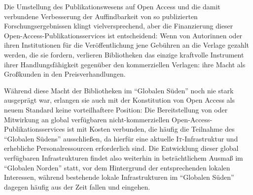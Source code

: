 \documentclass[a4paper,
fontsize=11pt,
oneside,
numbers=noperiodatend,
parskip=half-,
bibliography=totoc,
final
]{scrartcl}
\begin{document}
Die Umstellung des Publikationswesens auf Open Access und die damit
verbundene Verbesserung der Auffindbarkeit von so publizierten
Forschungsergebnissen klingt vielversprechend, aber die Finanzierung
dieser Open-Access-Publikationsservices ist entscheidend: Wenn von
Autorïnnen oder ihren Institutionen für die Veröffentlichung jene
Gebühren an die Verlage gezahlt werden, die sie fordern, verlieren
Bibliotheken das einzige kraftvolle Instrument ihrer Handlungsfähigkeit
gegenüber den kommerziellen Verlagen: ihre Macht als Großkunden in den
Preisverhandlungen.

Während diese Macht der Bibliotheken im \enquote{Globalen Süden} noch
nie stark ausgeprägt war, erlangen sie auch mit der Konstitution von
Open Access als neuem Standard keine vorteilhaftere Position: Die
Bereitstellung von oder Mitwirkung an global verfügbaren
nicht-kommerziellen Open-Access-Publikationsservices ist mit Kosten
verbunden, die häufig die Teilnahme des \enquote{Globalen Südens}
ausschließen, da hierfür eine aktuelle \textsc{It}-Infrastruktur und
erhebliche Personalressourcen erforderlich sind. Die Entwicklung dieser
global verfügbaren Infrastrukturen findet also weiterhin in
beträchtlichem Ausmaß im \enquote{Globalen Norden} statt, vor dem
Hintergrund der entsprechenden lokalen Interessen, während bestehende
lokale Infrastrukturen im \enquote{Globalen Süden} dagegen häufig aus
der Zeit fallen und eingehen.
\end{document}
